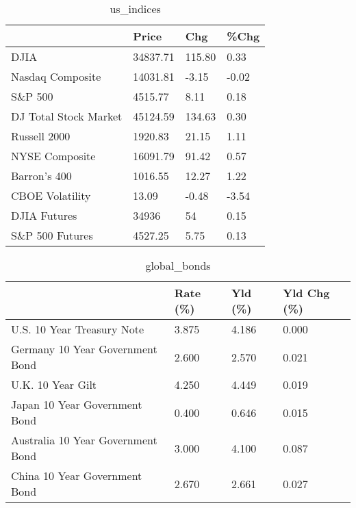 \documentclass{article}%
\begin{document}
%


\begin{table}[htbp]%
\caption{us\_indices}%
\centering%
\begin{adjustbox}{width=1\textwidth}%
\begin{tabular}{llll}
\toprule
                      &    Price &    Chg &  \%Chg \\
\midrule
                 DJIA & 34837.71 & 115.80 &  0.33 \\
     Nasdaq Composite & 14031.81 &  -3.15 & -0.02 \\
              S\&P 500 &  4515.77 &   8.11 &  0.18 \\
DJ Total Stock Market & 45124.59 & 134.63 &  0.30 \\
         Russell 2000 &  1920.83 &  21.15 &  1.11 \\
       NYSE Composite & 16091.79 &  91.42 &  0.57 \\
         Barron's 400 &  1016.55 &  12.27 &  1.22 \\
      CBOE Volatility &    13.09 &  -0.48 & -3.54 \\
         DJIA Futures &    34936 &     54 &  0.15 \\
      S\&P 500 Futures &  4527.25 &   5.75 &  0.13 \\
\bottomrule
\end{tabular}
%
\end{adjustbox}%
\end{table}

%


\begin{table}[htbp]%
\caption{global\_bonds}%
\centering%
\begin{adjustbox}{width=1\textwidth}%
\begin{tabular}{llll}
\toprule
                                  & Rate (\%) & Yld (\%) & Yld Chg (\%) \\
\midrule
       U.S. 10 Year Treasury Note &    3.875 &   4.186 &       0.000 \\
  Germany 10 Year Government Bond &    2.600 &   2.570 &       0.021 \\
                U.K. 10 Year Gilt &    4.250 &   4.449 &       0.019 \\
    Japan 10 Year Government Bond &    0.400 &   0.646 &       0.015 \\
Australia 10 Year Government Bond &    3.000 &   4.100 &       0.087 \\
    China 10 Year Government Bond &    2.670 &   2.661 &       0.027 \\
\bottomrule
\end{tabular}
%
\end{adjustbox}%
\end{table}
\end{document}
